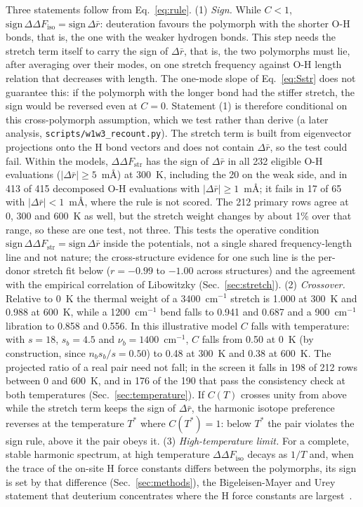 \documentclass[aps,prmaterials,reprint,superscriptaddress,nofootinbib]{revtex4-2}
\newcommand{\ddF}{\Delta\Delta F_{\mathrm{iso}}}
\begin{document}
Three statements follow from Eq.~\eqref{eq:rule}.
(1) \textit{Sign.} While $C<1$, $\mathrm{sign}\,\ddF = \mathrm{sign}\,\Delta\bar r$: deuteration favours the polymorph with the shorter O-H bonds, that is, the one with the weaker hydrogen bonds. This step needs the stretch term itself to carry the sign of $\Delta\bar r$, that is, the two polymorphs must lie, after averaging over their modes, on one stretch frequency against O-H length relation that decreases with length. The one-mode slope of Eq.~\eqref{eq:Sstr} does not guarantee this: if the polymorph with the longer bond had the stiffer stretch, the sign would be reversed even at $C = 0$. Statement (1) is therefore conditional on this cross-polymorph assumption, which we test rather than derive (a later analysis, \texttt{scripts/w1w3\_recount.py}). The stretch term is built from eigenvector projections onto the H bond vectors and does not contain $\Delta\bar r$, so the test could fail. Within the models, $\Delta\Delta F_{\mathrm{str}}$ has the sign of $\Delta\bar r$ in all 232 eligible O-H evaluations ($|\Delta\bar r| \geq 5$~m\AA) at 300~K, including the 20 on the weak side, and in 413 of 415 decomposed O-H evaluations with $|\Delta\bar r| \geq 1$~m\AA; it fails in 17 of 65 with $|\Delta\bar r| < 1$~m\AA, where the rule is not scored. The 212 primary rows agree at 0, 300 and 600~K as well, but the stretch weight changes by about 1\% over that range, so these are one test, not three. This tests the operative condition $\mathrm{sign}\,\Delta\Delta F_{\mathrm{str}} = \mathrm{sign}\,\Delta\bar r$ inside the potentials, not a single shared frequency-length line and not nature; the cross-structure evidence for one such line is the per-donor stretch fit below ($r = -0.99$ to $-1.00$ across structures) and the agreement with the empirical correlation of Libowitzky (Sec.~\ref{sec:stretch}).
(2) \textit{Crossover.} Relative to 0~K the thermal weight of a 3400~cm$^{-1}$ stretch is 1.000 at 300~K and 0.988 at 600~K, while a 1200~cm$^{-1}$ bend falls to 0.941 and 0.687 and a 900~cm$^{-1}$ libration to 0.858 and 0.556. In this illustrative model $C$ falls with temperature: with $s = 18$, $s_b = 4.5$ and $\nu_b = 1400$~cm$^{-1}$, $C$ falls from 0.50 at 0~K (by construction, since $n_b s_b/s = 0.50$) to 0.48 at 300~K and 0.38 at 600~K. The projected ratio of a real pair need not fall; in the screen it falls in 198 of 212 rows between 0 and 600~K, and in 176 of the 190 that pass the consistency check at both temperatures (Sec.~\ref{sec:temperature}). If $C(T)$ crosses unity from above while the stretch term keeps the sign of $\Delta\bar r$, the harmonic isotope preference reverses at the temperature $T^{*}$ where $C(T^{*}) = 1$: below $T^{*}$ the pair violates the sign rule, above it the pair obeys it.
(3) \textit{High-temperature limit.} For a complete, stable harmonic spectrum, at high temperature $\ddF$ decays as $1/T$ and, when the trace of the on-site H force constants differs between the polymorphs, its sign is set by that difference (Sec.~\ref{sec:methods}), the Bigeleisen-Mayer and Urey statement that deuterium concentrates where the H force constants are largest~\cite{Bigeleisen1947,Urey1947}.
\end{document}
